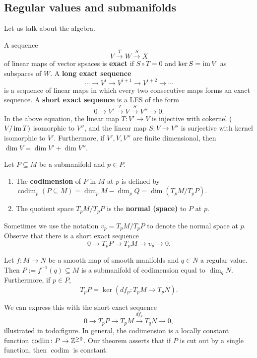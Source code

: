 \subsection{Regular values and submanifolds}
Let us talk about the algebra.
\begin{definition}[]
    A sequence \[
    V \overset{T}{\longrightarrow} W \overset{S}{\longrightarrow} X
    \] of linear maps of vector spsaces is \textbf{exact} if $S \circ T=0$ and $\ker S= \operatorname{im} V$ as subspaces of $W$. A \textbf{long exact sequence} \[
    \cdots \longrightarrow V^i \longrightarrow V^{i+1}\longrightarrow V^{i+2}\longrightarrow\cdots 
    \] is a sequence of linear maps in which every two consecutive maps forms an exact sequence. A \textbf{short exact sequence} is a LES of the form \[
    0 \longrightarrow V' \overset{T}{\longrightarrow} V \overset{S}{\longrightarrow} V''\longrightarrow 0.
\] In the above equation, the linear map $T \colon V' \to V$ is injective with cokernel ($V / \operatorname{im} T)$ isomorphic to $V''$, and the linear map $S \colon V \to V''$ is surjective with kernel isomorphic to $V'$. Furthermore, if $V',V,V''$ are finite dimensional, then $\dim V=\dim V'+\dim V''$.
\end{definition}
\begin{definition}
Let $P \subseteq M$ be a submanifold and $p \in P$. 
\begin{enumerate}[label=(\arabic*)]
    \item The \textbf{codimension} of $P$ in $M$ at $p$ is defined by $\operatorname{codim}_p(P \subseteq M)=\dim_p M-\dim_p Q=\dim (T_pM /T_pP)$.
    \item The quotient space $T_p M /T_p P$ is the \textbf{normal (space)} to $P$ at $p$.
\end{enumerate}
Sometimes we use the notation $v_p=T_p M /T_p P$ to denote the normal space at $p$. Observe that there is a short exact sequence \[
0 \longrightarrow T_p P \longrightarrow T_p M \longrightarrow v_p \longrightarrow 0.
\] 
\end{definition}
\begin{theorem}
    Let $f \colon M \to N$ be a smooth map of smooth manifolds and $q \in N$ a regular value. Then $P:= f ^{-1}(q) \subseteq M$ is a submanifold of codimension equal to $\dim_q N$. Furthermore, if $p \in P$, \[
        T_p P=\ker (df_p \colon T_p M \to T_p N).
    \] \end{theorem}
We can express this with the short exact sequence \[
    0 \longrightarrow T_p P \longrightarrow T_p M \overset{df_p}{\longrightarrow} T_q N\longrightarrow 0,
    \] illustrated in {\color{red}todo:figure.} In general, the codimension is a locally constant function $\operatorname{codim}\colon P \to \mathbb{Z}^{\geq 0}$. Our theorem asserts that if $P$ is cut out by a single function, then $\operatorname{codim}$ is constant.

